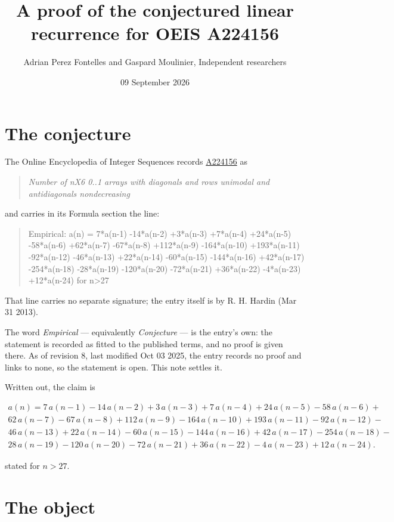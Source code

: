 \documentclass[11pt]{article}
\title{A proof of the conjectured linear recurrence for OEIS A224156}
\author{Adrian Perez Fontelles and Gaspard Moulinier, Independent researchers}
\date{09 September 2026}
\theoremstyle{definition}
\begin{document}
\maketitle
\section{The conjecture}

The Online Encyclopedia of Integer Sequences records \href{https://oeis.org/A224156}{A224156} as

\begin{quote}\itshape Number of nX6 0..1 arrays with diagonals and rows unimodal and antidiagonals nondecreasing\end{quote}

and carries in its Formula section the line:

\begin{quote}\ttfamily Empirical: a(n) = 7*a(n-1) -14*a(n-2) +3*a(n-3) +7*a(n-4) +24*a(n-5) -58*a(n-6) +62*a(n-7) -67*a(n-8) +112*a(n-9) -164*a(n-10) +193*a(n-11) -92*a(n-12) -46*a(n-13) +22*a(n-14) -60*a(n-15) -144*a(n-16) +42*a(n-17) -254*a(n-18) -28*a(n-19) -120*a(n-20) -72*a(n-21) +36*a(n-22) -4*a(n-23) +12*a(n-24) for n>27\end{quote}

That line carries no separate signature; the entry itself is by R. H. Hardin (Mar 31 2013).

The word {\itshape Empirical} --- equivalently {\itshape Conjecture} --- is the entry's own: the statement is recorded as fitted to the published terms, and no proof is given there. As of revision 8, last modified Oct 03 2025, the entry records no proof and links to none, so the statement is open. This note settles it.

Written out, the claim is

\begin{multline*} a(n) = 7\,a(n-1) - 14\,a(n-2) + 3\,a(n-3) + 7\,a(n-4) + 24\,a(n-5) - 58\,a(n-6) + \\ 62\,a(n-7) - 67\,a(n-8) + 112\,a(n-9) - 164\,a(n-10) + 193\,a(n-11) - 92\,a(n-12) - \\ 46\,a(n-13) + 22\,a(n-14) - 60\,a(n-15) - 144\,a(n-16) + 42\,a(n-17) - 254\,a(n-18) - \\ 28\,a(n-19) - 120\,a(n-20) - 72\,a(n-21) + 36\,a(n-22) - 4\,a(n-23) + 12\,a(n-24). \end{multline*}

stated for $n > 27$.

\section{The object}
\end{document}
